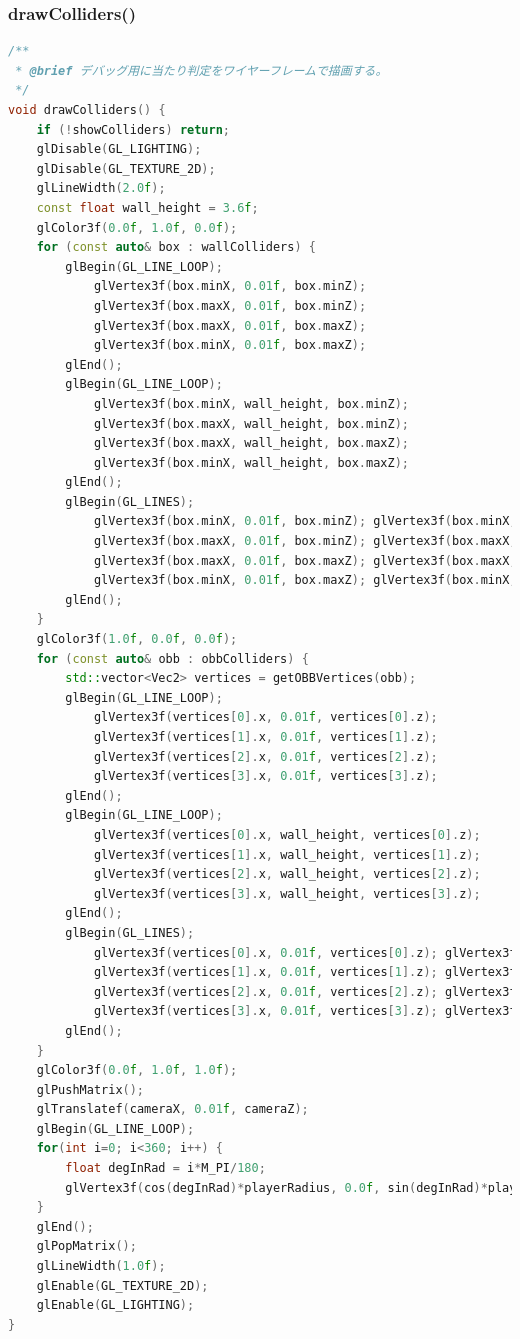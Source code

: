\documentclass[uplatex,dvipdfmx,a4paper]{jsarticle}
\begin{document}
\hypertarget{func:drawColliders}{}\subsubsection{drawColliders()}\label{func:drawColliders}
\begin{lstlisting}[language=C++, caption={drawColliders() 関数}, label={lst:drawColliders_detail}]
/**
 * @brief デバッグ用に当たり判定をワイヤーフレームで描画する。
 */
void drawColliders() {
    if (!showColliders) return;
    glDisable(GL_LIGHTING);
    glDisable(GL_TEXTURE_2D);
    glLineWidth(2.0f);
    const float wall_height = 3.6f;
    glColor3f(0.0f, 1.0f, 0.0f);
    for (const auto& box : wallColliders) {
        glBegin(GL_LINE_LOOP);
            glVertex3f(box.minX, 0.01f, box.minZ);
            glVertex3f(box.maxX, 0.01f, box.minZ);
            glVertex3f(box.maxX, 0.01f, box.maxZ);
            glVertex3f(box.minX, 0.01f, box.maxZ);
        glEnd();
        glBegin(GL_LINE_LOOP);
            glVertex3f(box.minX, wall_height, box.minZ);
            glVertex3f(box.maxX, wall_height, box.minZ);
            glVertex3f(box.maxX, wall_height, box.maxZ);
            glVertex3f(box.minX, wall_height, box.maxZ);
        glEnd();
        glBegin(GL_LINES);
            glVertex3f(box.minX, 0.01f, box.minZ); glVertex3f(box.minX, wall_height, box.minZ);
            glVertex3f(box.maxX, 0.01f, box.minZ); glVertex3f(box.maxX, wall_height, box.minZ);
            glVertex3f(box.maxX, 0.01f, box.maxZ); glVertex3f(box.maxX, wall_height, box.maxZ);
            glVertex3f(box.minX, 0.01f, box.maxZ); glVertex3f(box.minX, wall_height, box.maxZ);
        glEnd();
    }
    glColor3f(1.0f, 0.0f, 0.0f);
    for (const auto& obb : obbColliders) {
        std::vector<Vec2> vertices = getOBBVertices(obb);
        glBegin(GL_LINE_LOOP);
            glVertex3f(vertices[0].x, 0.01f, vertices[0].z);
            glVertex3f(vertices[1].x, 0.01f, vertices[1].z);
            glVertex3f(vertices[2].x, 0.01f, vertices[2].z);
            glVertex3f(vertices[3].x, 0.01f, vertices[3].z);
        glEnd();
        glBegin(GL_LINE_LOOP);
            glVertex3f(vertices[0].x, wall_height, vertices[0].z);
            glVertex3f(vertices[1].x, wall_height, vertices[1].z);
            glVertex3f(vertices[2].x, wall_height, vertices[2].z);
            glVertex3f(vertices[3].x, wall_height, vertices[3].z);
        glEnd();
        glBegin(GL_LINES);
            glVertex3f(vertices[0].x, 0.01f, vertices[0].z); glVertex3f(vertices[0].x, wall_height, vertices[0].z);
            glVertex3f(vertices[1].x, 0.01f, vertices[1].z); glVertex3f(vertices[1].x, wall_height, vertices[1].z);
            glVertex3f(vertices[2].x, 0.01f, vertices[2].z); glVertex3f(vertices[2].x, wall_height, vertices[2].z);
            glVertex3f(vertices[3].x, 0.01f, vertices[3].z); glVertex3f(vertices[3].x, wall_height, vertices[3].z);
        glEnd();
    }
    glColor3f(0.0f, 1.0f, 1.0f);
    glPushMatrix();
    glTranslatef(cameraX, 0.01f, cameraZ);
    glBegin(GL_LINE_LOOP);
    for(int i=0; i<360; i++) {
        float degInRad = i*M_PI/180;
        glVertex3f(cos(degInRad)*playerRadius, 0.0f, sin(degInRad)*playerRadius);
    }
    glEnd();
    glPopMatrix();
    glLineWidth(1.0f);
    glEnable(GL_TEXTURE_2D);
    glEnable(GL_LIGHTING);
}
\end{lstlisting}
\end{document}
